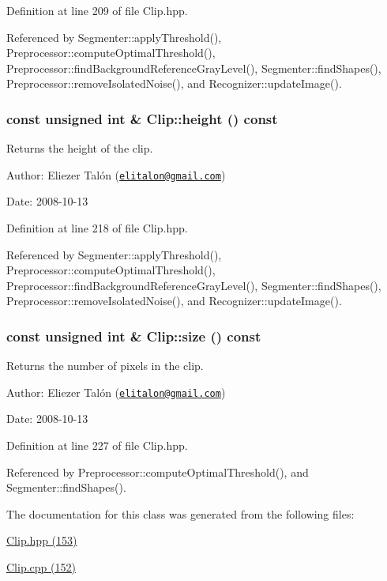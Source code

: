 Definition at line 209 of file Clip.hpp.

Referenced by Segmenter::applyThreshold(), Preprocessor::computeOptimalThreshold(), Preprocessor::findBackgroundReferenceGrayLevel(), Segmenter::findShapes(), Preprocessor::removeIsolatedNoise(), and Recognizer::updateImage().\hypertarget{class_clip_939908a8dde602d25335792cc0fd5d97}{
\subsubsection[height]{\setlength{\rightskip}{0pt plus 5cm}const unsigned int \& Clip::height () const}}
\label{class_clip_939908a8dde602d25335792cc0fd5d97}


Returns the height of the clip. 

\begin{Desc}
\item[Author:]Eliezer Talón (\href{mailto:elitalon@gmail.com}{\tt elitalon@gmail.com}) \end{Desc}
\begin{Desc}
\item[Date:]2008-10-13 \end{Desc}


Definition at line 218 of file Clip.hpp.

Referenced by Segmenter::applyThreshold(), Preprocessor::computeOptimalThreshold(), Preprocessor::findBackgroundReferenceGrayLevel(), Segmenter::findShapes(), Preprocessor::removeIsolatedNoise(), and Recognizer::updateImage().\hypertarget{class_clip_eb6b12a1a0570b529d6a09633b991fcd}{
\subsubsection[size]{\setlength{\rightskip}{0pt plus 5cm}const unsigned int \& Clip::size () const}}
\label{class_clip_eb6b12a1a0570b529d6a09633b991fcd}


Returns the number of pixels in the clip. 

\begin{Desc}
\item[Author:]Eliezer Talón (\href{mailto:elitalon@gmail.com}{\tt elitalon@gmail.com}) \end{Desc}
\begin{Desc}
\item[Date:]2008-10-13 \end{Desc}


Definition at line 227 of file Clip.hpp.

Referenced by Preprocessor::computeOptimalThreshold(), and Segmenter::findShapes().

The documentation for this class was generated from the following files:\begin{CompactItemize}
\item 
\hyperlink{_clip_8hpp}{Clip.hpp (153)}\item 
\hyperlink{_clip_8cpp}{Clip.cpp (152)}\end{CompactItemize}
